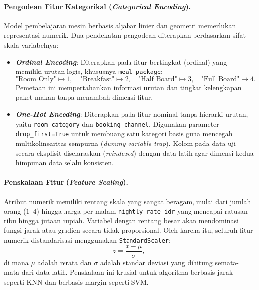 \paragraph{Pengodean Fitur Kategorikal (\textit{Categorical Encoding}).}
Model pembelajaran mesin berbasis aljabar linier dan geometri memerlukan representasi numerik.
Dua pendekatan pengodean diterapkan berdasarkan sifat skala variabelnya:
\begin{itemize}
  \item \textbf{\textit{Ordinal Encoding}}: Diterapkan pada fitur bertingkat (ordinal) yang memiliki urutan logis,
        khususnya \texttt{meal\_package}:
        \[
        \text{"Room Only"} \mapsto 1,\quad \text{"Breakfast"} \mapsto 2,\quad \text{"Half Board"} \mapsto 3,\quad \text{"Full Board"} \mapsto 4 .
        \]
        Pemetaan ini mempertahankan informasi urutan dan tingkat kelengkapan paket makan tanpa menambah dimensi fitur.
  \item \textbf{\textit{One-Hot Encoding}}: Diterapkan pada fitur nominal tanpa hierarki urutan, yaitu \texttt{room\_category}
        dan \texttt{booking\_channel}. Digunakan parameter \texttt{drop\_first=True} untuk membuang satu kategori basis
        guna mencegah multikolinearitas sempurna (\textit{dummy variable trap}). Kolom pada data uji secara eksplisit
        diselaraskan (\textit{reindexed}) dengan data latih agar dimensi kedua himpunan data selalu konsisten.
\end{itemize}

\paragraph{Penskalaan Fitur (\textit{Feature Scaling}).}
Atribut numerik memiliki rentang skala yang sangat beragam, mulai dari jumlah orang ($1$--$4$) hingga harga per malam
\texttt{nightly\_rate\_idr} yang mencapai ratusan ribu hingga jutaan rupiah. Variabel dengan rentang besar akan
mendominasi fungsi jarak atau gradien secara tidak proporsional. Oleh karena itu, seluruh fitur numerik distandarisasi
menggunakan \texttt{StandardScaler}:
\[
z = \frac{x - \mu}{\sigma} ,
\]
di mana $\mu$ adalah rerata dan $\sigma$ adalah standar deviasi yang dihitung semata-mata dari data latih.
Penskalaan ini krusial untuk algoritma berbasis jarak seperti KNN dan berbasis margin seperti SVM.

